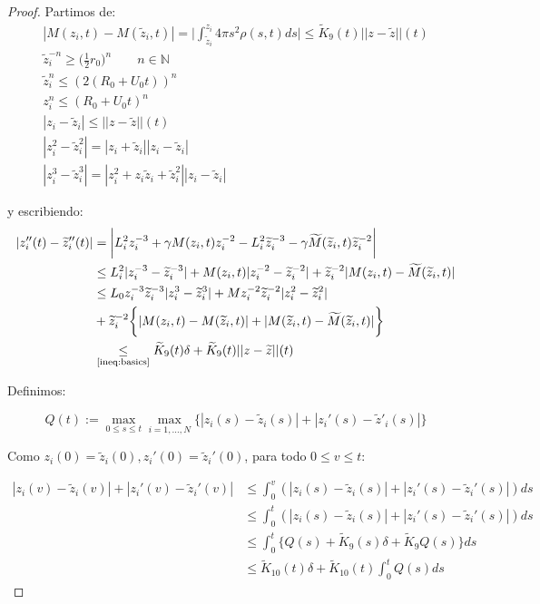 \documentclass[a4paper,10pt]{scrartcl}
\theoremstyle{definition}
\newcommand{\ktilde}{\widetilde{K}}
\numberwithin{equation}{section}
\begin{document}
\begin{proof}
Partimos de:
\begin{align}
 |M(z_i,t) - M(\widetilde{z}_i,t)| = \bigg|\int_{\widetilde{z}_i}^{z_i} 4\pi s^2 \rho(s,t) ds \bigg| \le \ktilde_9(t) ||z-\widetilde{z}||(t) \nonumber\\
 \widetilde{z}_i^{-n} \ge \bigg(\frac{1}{2} r_0\bigg)^{n} \qquad n\in\mathbb{N} \nonumber\\
 \widetilde{z}_i^n \le (2(R_0+U_0t))^n \nonumber\\
 z_i^n \le (R_0+U_0t)^n \nonumber\\
 |z_i - \widetilde{z}_i| \le ||z-\widetilde{z}||(t) \nonumber\\
 |z_i^2 - \widetilde{z}_i^2| = |z_i + \widetilde{z}_i||z_i - \widetilde{z}_i| \nonumber\\
 |z_i^3 - \widetilde{z}_i^3| = |z_i^2 + z_i\widetilde{z}_i + \widetilde{z}_i^2||z_i - \widetilde{z}_i|
 \label{ineq:basics}
\end{align}

y escribiendo:
\begin{align}
 |z_i''(t) - \widetilde{z}_i''(t)| &= \bigg|L_i^2 z_i^{-3} + \gamma M(z_i,t) z_i^{-2} - L_i^2 \widetilde{z}_i^{-3} - \gamma \widetilde{M}(\widetilde{z}_i, t) \widetilde{z}_i^{-2} \bigg| \nonumber\\
 &\le L_i^2 |z_i^{-3} - \widetilde{z}_i^{-3}| + M(z_i, t) |z_i^{-2} - \widetilde{z}_i^{-2}| + \widetilde{z}_i^{-2} |M(z_i,t) - \widetilde{M}(\widetilde{z}_i, t)|\nonumber\\
 &\le L_0 z_i^{-3}\widetilde{z}_i^{-3} |z_i^3 - \widetilde{z}_i^{3}| +
 Mz_i^{-2} \widetilde{z}_i^{-2} |z_i^2 - \widetilde{z}_i^{2}| \nonumber \\
 &+ \widetilde{z}_i^{-2} \bigg\{|M(z_i,t) - M(\widetilde{z}_i,t)| + |M(\widetilde{z}_i,t) - \widetilde{M}(\widetilde{z}_i,t)|\bigg\} \nonumber\\
 &\underset{\textrm{\eqref{ineq:basics}}}{\le} \ktilde_9(t) \delta + \ktilde_9(t)||z - \widetilde{z}||(t)
 \label{ineq:zibound}
\end{align}

Definimos:

\[
Q(t) := \max_{0 \le s \le t}\max_{i = 1, \ldots, N} \bigg\{|z_i(s) - \widetilde{z}_i(s)| + |z_i'(s) - \widetilde{z}'_i(s)| \bigg\} 
\]

Como $z_i(0) = \widetilde{z}_i(0), z_i'(0) = \widetilde{z}_i'(0)$, para todo $0\le v \le t$:

\begin{align*}
 |z_i(v) - \widetilde{z}_i(v)| + |z_i'(v) - \widetilde{z}_i'(v)| &\le \int_0^v (|z_i(s) - \widetilde{z}_i(s)| + |z_i'(s) - \widetilde{z}_i'(s)|) ds\\
 &\le \int_0^t (|z_i(s) - \widetilde{z}_i(s)| + |z_i'(s) - \widetilde{z}_i'(s)|) ds\\
 &\le \int_0^t \bigg\{Q(s) + \ktilde_9(s)\delta + \ktilde_9 Q(s)\bigg\} ds \\
 &\le \ktilde_{10}(t)\delta + \ktilde_{10}(t) \int_0^{t} Q(s) ds
\end{align*}


\end{proof}
\end{document}
